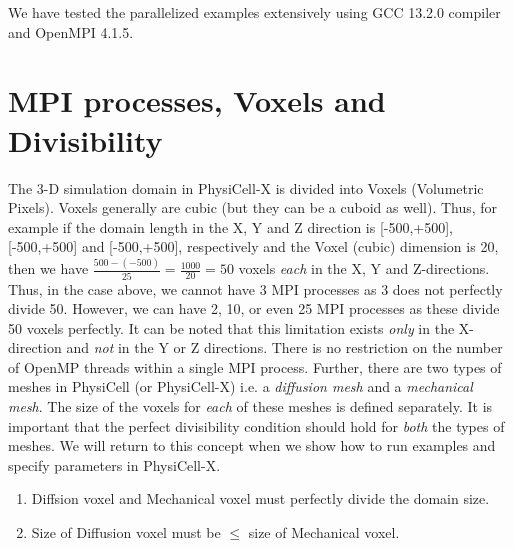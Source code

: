 \documentclass[12pt]{article}
\begin{document}
\begin{tcolorbox}[enhanced,attach boxed title to top center={yshift=-3mm,yshifttext=-1mm},
  colback=blue!5!white,colframe=blue!75!black,colbacktitle=red!80!black,
  title=IMPORTANT,fonttitle=\bfseries,
  boxed title style={size=small,colframe=red!50!black} ]
  We have tested the parallelized examples extensively using GCC 13.2.0 compiler and OpenMPI 4.1.5.
\end{tcolorbox}
 
\section{MPI processes, Voxels and Divisibility}
The 3-D simulation domain in PhysiCell-X is divided into Voxels (Volumetric Pixels). Voxels generally are cubic (but they can be a cuboid as well). Thus, for example if the domain length in the X, Y and Z direction is [-500,+500], [-500,+500] and [-500,+500], respectively and the Voxel (cubic) dimension is 20, then we have $\frac{500 - (-500)}{25} = \frac{1000}{20}=50$ voxels \textit{each} in the X, Y and Z-directions. Thus, in the case above, we cannot have 3 MPI processes as 3 does not perfectly divide 50. However, we can have 2, 10, or even 25 MPI processes as these divide 50 voxels perfectly. It can be noted that this limitation exists \textit{only} in the X-direction and \textit{not} in the Y or Z directions. There is no restriction on the number of OpenMP threads within a single MPI process. Further, there are two types of meshes in PhysiCell (or PhysiCell-X) i.e. a \textit{diffusion mesh} and a \textit{mechanical mesh}. The size of the voxels for \textit{each} of these meshes is defined separately. It is important that the perfect divisibility condition should hold for \textit{both} the types of meshes.    
We will return to this concept when we show how to run examples and specify parameters in PhysiCell-X.    

\begin{tcolorbox}[enhanced,attach boxed title to top center={yshift=-3mm,yshifttext=-1mm},
  colback=blue!5!white,colframe=blue!75!black,colbacktitle=red!80!black,
  title=IMPORTANT,fonttitle=\bfseries,
  boxed title style={size=small,colframe=red!50!black} ]
  \begin{enumerate}
  \item Diffsion voxel and Mechanical voxel must perfectly divide the domain size.
  \item Size of Diffusion voxel must be $\leq$ size of Mechanical voxel.
  \end{enumerate}
\end{tcolorbox}
\end{document}

